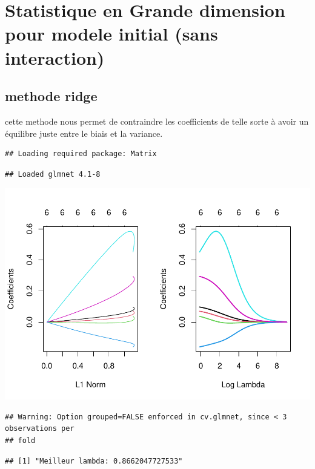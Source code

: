 \documentclass[
  12pt,
]{article}
\begin{document}
\section{Statistique en Grande dimension pour modele initial (sans
interaction)}\label{statistique-en-grande-dimension-pour-modele-initial-sans-interaction}

\subsection{methode ridge}\label{methode-ridge}

cette methode nous permet de contraindre les coefficients de telle sorte
à avoir un équilibre juste entre le biais et la variance.

\begin{verbatim}
## Loading required package: Matrix
\end{verbatim}

\begin{verbatim}
## Loaded glmnet 4.1-8
\end{verbatim}

\includegraphics{rmd_final_files/figure-latex/unnamed-chunk-62-1.pdf}

\begin{verbatim}
## Warning: Option grouped=FALSE enforced in cv.glmnet, since < 3 observations per
## fold
\end{verbatim}

\begin{verbatim}
## [1] "Meilleur lambda: 0.8662047727533"
\end{verbatim}
\end{document}

